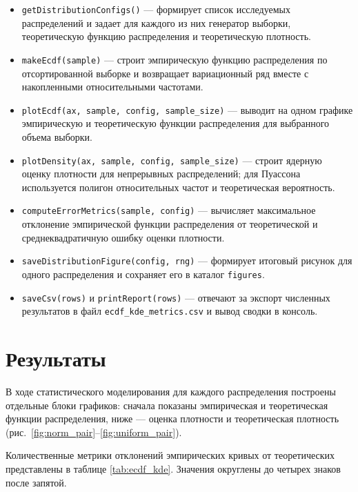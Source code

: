 \documentclass[a4paper, 14pt]{extarticle}
\begin{document}
\begin{itemize}
    \item \texttt{getDistributionConfigs()} --- формирует список исследуемых распределений и задает для каждого из них генератор выборки, теоретическую функцию распределения и теоретическую плотность.
    \item \texttt{makeEcdf(sample)} --- строит эмпирическую функцию распределения по отсортированной выборке и возвращает вариационный ряд вместе с накопленными относительными частотами.
    \item \texttt{plotEcdf(ax, sample, config, sample\_size)} --- выводит на одном графике эмпирическую и теоретическую функции распределения для выбранного объема выборки.
    \item \texttt{plotDensity(ax, sample, config, sample\_size)} --- строит ядерную оценку плотности для непрерывных распределений; для Пуассона используется полигон относительных частот и теоретическая вероятность.
    \item \texttt{computeErrorMetrics(sample, config)} --- вычисляет максимальное отклонение эмпирической функции распределения от теоретической и среднеквадратичную ошибку оценки плотности.
    \item \texttt{saveDistributionFigure(config, rng)} --- формирует итоговый рисунок для одного распределения и сохраняет его в каталог \texttt{figures}.
    \item \texttt{saveCsv(rows)} и \texttt{printReport(rows)} --- отвечают за экспорт численных результатов в файл \texttt{ecdf\_kde\_metrics.csv} и вывод сводки в консоль.
\end{itemize}

\section{Результаты}

В ходе статистического моделирования для каждого распределения построены отдельные блоки графиков: сначала показаны эмпирическая и теоретическая функции распределения, ниже --- оценка плотности и теоретическая плотность (рис.~\ref{fig:norm_pair}--\ref{fig:uniform_pair}). 

Количественные метрики отклонений эмпирических кривых от теоретических представлены в таблице \ref{tab:ecdf_kde}. Значения округлены до четырех знаков после запятой.
\end{document}
